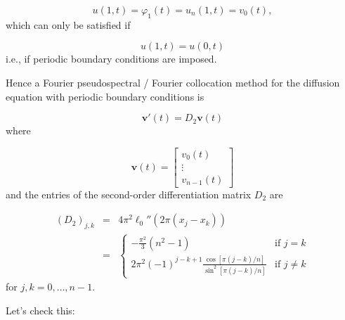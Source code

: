 \documentclass[12pt,a4paper]{article}
\begin{document}
\[
u(1,t) = \varphi_1(t) = u_n(1,t) = v_0(t),
\]
which can only be satisfied if

\[
u(1,t) = u(0,t)
\]
i.e., if periodic boundary conditions are imposed.

Hence a Fourier pseudospectral / Fourier collocation method for the diffusion equation with periodic boundary conditions is

\[
\mathbf{v}'(t) = D_2 \mathbf{v}(t)
\]
where

\[
\mathbf{v}(t) = \begin{bmatrix}
v_0(t) \\
\vdots \\
v_{n-1}(t)
\end{bmatrix}
\]
and the entries of the second-order differentiation matrix $D_2$ are


\begin{eqnarray*}
\left(D_2\right)_{j,k} &=& 4\pi^2\ell_0''(2\pi (x_j- x_k)) \\
&=& \begin{cases}
-\frac{\pi^2}{3}\left(n^2 - 1    \right)  & \text{if } j = k\\
\displaystyle{2\pi^2(-1)^{j-k+1}\frac{\cos [\pi (j-k)/n] }{ \sin^2 [\pi (j-k)/n] }} & \text{if } j \neq k
\end{cases}
\end{eqnarray*}
for $j,k = 0, \ldots, n-1$.

Let's check this:
\end{document}
